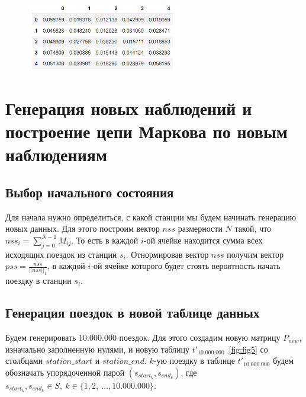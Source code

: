 \documentclass[specialist, substylefile = spbu_report.rtx, subf,href,colorlinks=true, 12pt]{disser}
\begin{document}
\newpage

\begin{figure}[h]
    \centering
    \includegraphics[width = 0.6\textwidth]{3.png}
    \begin{caption}
    	 \label{fig:fig3}
    \end{caption}
\end{figure}

\chapter{Генерация новых наблюдений и построение цепи Маркова по новым наблюдениям}
\section{Выбор начального состояния}
Для начала нужно определиться, с какой станции мы будем начинать генерацию новых данных. Для этого построим вектор $nss$ размерности $N$ такой, что $nss_i = \sum\limits_{j = 0}^{N-1}{M_{ij}}$. То есть в каждой $i$-ой ячейке находится сумма всех исходящих поездок из станции $s_i$. Отнормировав вектор $nss$ получим вектор $pss = \frac{nss}{||nss||_{1}}$, в каждой $i$-ой ячейке которого будет стоять вероятность начать поездку в станции $s_i$.

\section{Генерация поездок в новой таблице данных}
Будем генерировать $10.000.000$ поездок. Для этого создадим новую матрицу $P_{new}$, изначально заполненную нулями, и новую таблицу $t'_{10.000.000}$~\eqref{fig:fig5} со столбцами $station\_start$ и $station\_end$. $k$-ую поездку в таблице $t'_{10.000.000}$ будем обозначать упорядоченной парой $(s_{start_k}, s_{end_k})$, где $s_{start_k}, s_{end_k}\in S, \ k \in \{1, 2, \ \ldots, 10.000.000\}$.
\end{document}
